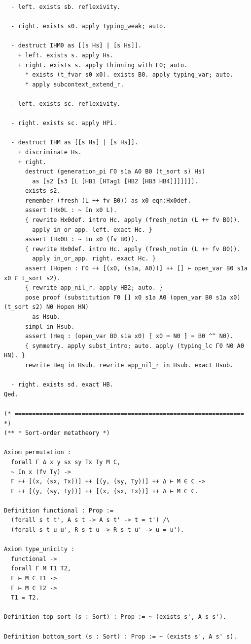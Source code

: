 \begin{latin}
\begin{verbatim}
  - left. exists sb. reflexivity.

  - right. exists s0. apply typing_weak; auto.

  - destruct IHM0 as [[s Hs] | [s Hs]].
    + left. exists s. apply Hs.
    + right. exists s. apply thinning with Γ0; auto.
      * exists (t_fvar s0 x0). exists B0. apply typing_var; auto.
      * apply subcontext_extend_r.

  - left. exists sc. reflexivity.

  - right. exists sc. apply HPi.

  - destruct IHM as [[s Hs] | [s Hs]].
    + discriminate Hs.
    + right.
      destruct (generation_pi Γ0 s1a A0 B0 (t_sort s) Hs)
        as [s2 [s3 [L [HB1 [HTag1 [HB2 [HB3 HB4]]]]]]].
      exists s2.
      remember (fresh (L ++ fv B0)) as x0 eqn:Hx0def.
      assert (Hx0L : ~ In x0 L).
      { rewrite Hx0def. intro Hc. apply (fresh_notin (L ++ fv B0)).
        apply in_or_app. left. exact Hc. }
      assert (Hx0B : ~ In x0 (fv B0)).
      { rewrite Hx0def. intro Hc. apply (fresh_notin (L ++ fv B0)).
        apply in_or_app. right. exact Hc. }
      assert (Hopen : Γ0 ++ [(x0, (s1a, A0))] ++ [] ⊢ open_var B0 s1a x0 ∈ t_sort s2).
      { rewrite app_nil_r. apply HB2; auto. }
      pose proof (substitution Γ0 [] x0 s1a A0 (open_var B0 s1a x0) (t_sort s2) N0 Hopen HN)
        as Hsub.
      simpl in Hsub.
      assert (Heq : (open_var B0 s1a x0) ⁅ x0 ≔ N0 ⁆ = B0 ^^ N0).
      { symmetry. apply subst_intro; auto. apply (typing_lc Γ0 N0 A0 HN). }
      rewrite Heq in Hsub. rewrite app_nil_r in Hsub. exact Hsub.

  - right. exists sd. exact HB.
Qed.

(* ================================================================= *)
(** * Sort-order metatheory *)

Axiom permutation :
  forall Γ Δ x y sx sy Tx Ty M C,
  ~ In x (fv Ty) ->
  Γ ++ [(x, (sx, Tx))] ++ [(y, (sy, Ty))] ++ Δ ⊢ M ∈ C ->
  Γ ++ [(y, (sy, Ty))] ++ [(x, (sx, Tx))] ++ Δ ⊢ M ∈ C.

Definition functional : Prop :=
  (forall s t t', A s t -> A s t' -> t = t') /\ 
  (forall s t u u', R s t u -> R s t u' -> u = u').

Axiom type_unicity : 
  functional -> 
  forall Γ M T1 T2, 
  Γ ⊢ M ∈ T1 ->
  Γ ⊢ M ∈ T2 ->
  T1 = T2.

Definition top_sort (s : Sort) : Prop := ~ (exists s', A s s').

Definition bottom_sort (s : Sort) : Prop := ~ (exists s', A s' s).


\end{verbatim}
\end{latin}
